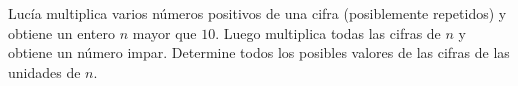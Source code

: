 Lucía multiplica varios números positivos de una cifra (posiblemente repetidos) y obtiene un entero $n$ mayor que $10$. Luego multiplica todas las cifras de $n$ y obtiene un número impar. Determine todos los posibles valores de las cifras de las unidades de $n$.